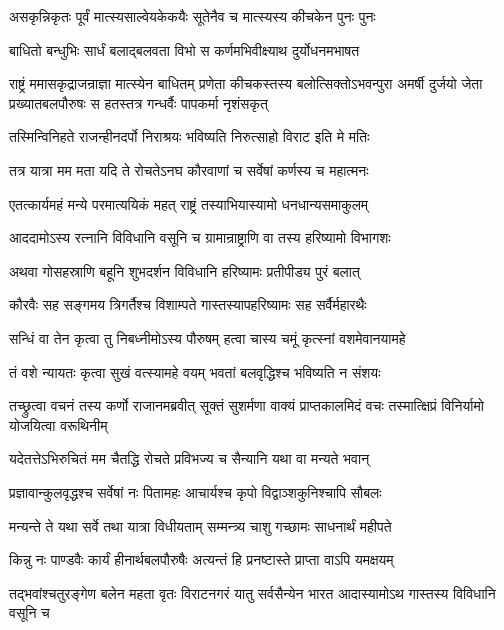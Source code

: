 \twolineshloka
{असकृन्निकृतः पूर्वं मात्स्यसाल्वेयकेकयैः}
{सूतेनैव च मात्स्यस्य कीचकेन पुनः पुनः}


\twolineshloka
{बाधितो बन्धुभिः सार्धं बलाद्बलवता विभो}
{स कर्णमभिवीक्ष्याथ दुर्योधनमभाषत}


\onelineshloka
{राष्ट्रं ममासकृद्राजन्राज्ञा मात्स्येन बाधितम्}
\threelineshloka
{प्रणेता कीचकस्तस्य बलोत्सिक्तोऽभवन्पुरा}
{अमर्षी दुर्जयो जेता प्रख्यातबलपौरुषः}
{स हतस्तत्र गन्धर्वैः पापकर्मा नृशंसकृत्}


\twolineshloka
{तस्मिन्विनिहते राजन्हीनदर्पो निराश्रयः}
{भविष्यति निरुत्साहो विराट इति मे मतिः}


\twolineshloka
{तत्र यात्रा मम मता यदि ते रोचतेऽनघ}
{कौरवाणां च सर्वेषां कर्णस्य च महात्मनः}


\twolineshloka
{एतत्कार्यमहं मन्ये परमात्ययिकं महत्}
{राष्ट्रं तस्याभियास्यामो धनधान्यसमाकुलम्}


\twolineshloka
{आददामोऽस्य रत्नानि विविधानि वसूनि च}
{ग्रामान्राष्ट्राणि वा तस्य हरिष्यामो विभागशः}


\twolineshloka
{अथवा गोसहस्राणि बहूनि शुभदर्शन}
{विविधानि हरिष्यामः प्रतीपीड्य पुरं बलात्}


\twolineshloka
{कौरवैः सह सङ्गमय त्रिगर्तैश्च विशाम्पते}
{गास्तस्यापहरिष्यामः सह सर्वैर्महारथैः}


\twolineshloka
{सन्धिं वा तेन कृत्वा तु निबध्नीमोऽस्य पौरुषम्}
{हत्वा चास्य चमूं कृत्स्नां वशमेवानयामहे}


\twolineshloka
{तं वशे न्यायतः कृत्वा सुखं वत्स्यामहे वयम्}
{भवतां बलवृद्धिश्च भविष्यति न संशयः}



\onelineshloka
{तच्छ्रुत्वा वचनं तस्य कर्णो राजानमब्रवीत्}
\twolineshloka
{सूक्तं सुशर्मणा वाक्यं प्राप्तकालमिदं वचः}
{तस्मात्क्षिप्रं विनिर्यामो योजयित्वा वरूथिनीम्}


\twolineshloka
{यदेतत्तेऽभिरुचितं मम चैतद्धि रोचते}
{प्रविभज्य च सैन्यानि यथा वा मन्यते भवान्}





\twolineshloka
{प्रज्ञावान्कुलवृद्धश्च सर्वेषां नः पितामहः}
{आचार्यश्च कृपो विद्वाञ्शकुनिश्चापि सौबलः}


\twolineshloka
{मन्यन्ते ते यथा सर्वे तथा यात्रा विधीयताम्}
{सम्मन्त्र्य चाशु गच्छामः साधनार्थं महीपते}


\twolineshloka
{किन्नु नः पाण्डवैः कार्यं हीनार्थबलपौरुषैः}
{अत्यन्तं हि प्रनष्टास्ते प्राप्ता वाऽपि यमक्षयम्}


\threelineshloka
{तद्भवांश्चतुरङ्गेण बलेन महता वृतः}
{विराटनगरं यातु सर्वसैन्येन भारत}
{आदास्यामोऽथ गास्तस्य विविधानि वसूनि च}



